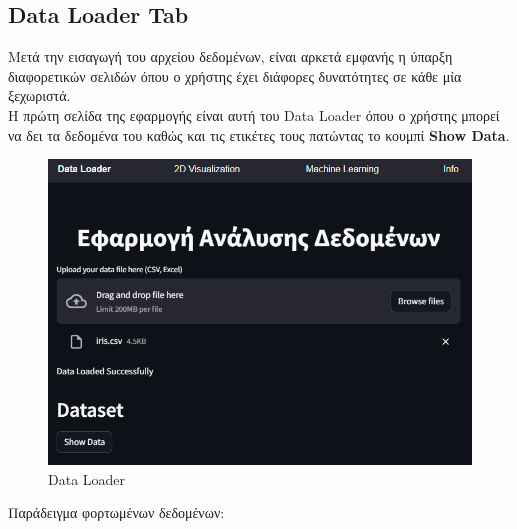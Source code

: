 \documentclass{article}
\begin{document}
\newpage

\subsection{Data Loader Tab}
Μετά την εισαγωγή του αρχείου δεδομένων, είναι αρκετά εμφανής η ύπαρξη διαφορετικών σελιδών όπου ο χρήστης έχει διάφορες δυνατότητες σε κάθε μία ξεχωριστά.\\
\vspace{0.3 cm}
Η πρώτη σελίδα της εφαρμογής είναι αυτή του Data Loader  όπου ο χρήστης μπορεί να δει τα δεδομένα του καθώς και τις ετικέτες τους πατώντας το κουμπί \textbf{Show Data}.

\begin{figure}[h!]
  \centering
  \includegraphics[width=0.6\textheight]{photos/data_loader.png}
  \caption{Data Loader}
  \label{fig:DataLoader}
\end{figure}
\newpage
Παράδειγμα φορτωμένων δεδομένων:
\end{document}
